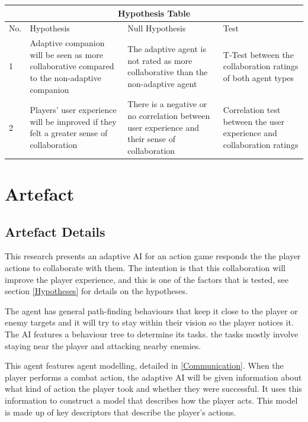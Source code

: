 \documentclass{IEEEtran}
\begin{document}
\begin{tabular}{ |p{0.3cm}|p{2.5cm}|p{2.5cm}|p{1.8cm}|  }
 \hline
 \multicolumn{4}{|c|}{Hypothesis Table} \\
 \hline
 No. & Hypothesis & Null Hypothesis & Test\\
 \hline
    1 & Adaptive companion will be seen as more collaborative compared to the non-adaptive companion & 
    The adaptive agent is not rated as more collaborative than the non-adaptive agent &
    T-Test between the collaboration ratings of both agent types \\
 \hline
    2 & Players' user experience will be improved if they felt a greater sense of collaboration & 
    There is a negative or no correlation between user experience and their sense of collaboration &
    Correlation test between the user experience and collaboration ratings\\
 \hline
\end{tabular}

\section{Artefact}
\label{Artefact}

\subsection{Artefact Details}
\label{ArtefactDetails}

This research presents an adaptive AI for an action game responds the the player actions to collaborate with them. The intention is that this collaboration will improve the player experience, and this is one of the factors that is tested, see section \ref{Hypotheses} for details on the hypotheses.

The agent has general path-finding behaviours that keep it close to the player or enemy targets and it will try to stay within their vision so the player notices it. The AI features a behaviour tree to determine its tasks. the tasks mostly involve staying near the player and attacking nearby enemies.

This agent features agent modelling, detailed in \ref{Communication}. When the player performs a combat action, the adaptive AI will be given information about what kind of action the player took and whether they were successful. It uses this information to construct a model that describes how the player acts. This model is made up of key descriptors that describe the player's actions.
\end{document}

